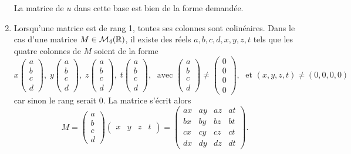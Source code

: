 \begin{enumerate}
La matrice de $u$ dans cette base est bien de la forme demandée.
\item Lorsqu'une matrice est de rang 1, toutes ses colonnes sont colinéaires.\newline
Dans le cas d'une matrice $M \in \mathcal{M}_4(\mathbb{R})$, il existe des réels $a,b,c,d,x,y,z,t$ tels que les quatre colonnes de $M$ soient de la forme
\[
x \begin{pmatrix}
a\\ b \\ c \\d
 \end{pmatrix}, \;  
y \begin{pmatrix}
a\\ b \\ c \\d
 \end{pmatrix}, \; 
z \begin{pmatrix}
a\\ b \\ c \\d
 \end{pmatrix}, \;
t \begin{pmatrix}
a\\ b \\ c \\d
 \end{pmatrix}, \;
\text{ avec } 
\begin{pmatrix}
a\\ b \\ c \\d
 \end{pmatrix}
\neq
\begin{pmatrix}
0\\ 0 \\ 0 \\0
 \end{pmatrix}, \;
\text{ et } (x,y,z,t)\neq(0,0,0,0)
\]
car sinon le rang serait 0. La matrice s'écrit alors
\[
  M =
  \begin{pmatrix}
    a \\ b \\ c \\d
  \end{pmatrix}
  \begin{pmatrix}
    x & y & z & t
  \end{pmatrix}
  =
  \begin{pmatrix}
    ax & ay & az & at \\
    bx & by & bz & bt \\
    cx & cy & cz & ct \\
    dx & dy & dz & dt 
  \end{pmatrix}
.
\]


\end{enumerate}
